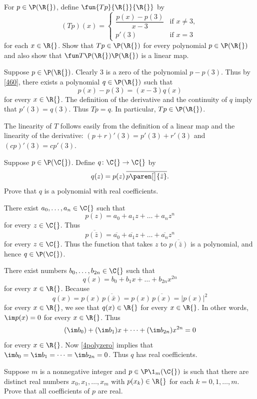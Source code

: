 \exercise
For $p \in \P(\R{})$, define $\fun {Tp} {\R{}} {\R{}}$ by
\[
(Tp)(x) =
\begin{cases}
\dfrac{p(x) - p(3)}{x-3} & \text{if } x \ne 3,\\[9bp]
p' \! (3) & \text{if } x = 3
\end{cases}
\]
for each $x \in \R{}$. Show that $Tp \in \P(\R{})$ for every polynomial $p \in \P(\R{})$ and also show that $\fun T {\P(\R{})} {\P(\R{})}$ is a linear map.

\begin{Solution}
Suppose $p \in \P(\R{})$. Clearly $3$ is a zero of the polynomial $p - p(3)$. Thus by \ref{460}, there exists a polynomial $q \in \P(\R{})$ such that
\[
p(x) - p(3) = (x - 3) q(x)
\]
for every $x \in \R{}$. The definition of the derivative and the continuity of $q$ imply that $p' \! (3) = q(3)$. Thus $Tp = q$. In particular, $Tp \in \P(\R{})$.

The linearity of $T$ follows easily from the definition of a linear map and the linearity of the derivative: $(p + r)' \! (3) = p' \! (3) + r' \! (3)$ and $(cp)' \! (3) = c p' \! (3)$.
\end{Solution}

\exercise
Suppose $p \in \P(\C{})$. Define $q \colon \C{} \to \C{}$ by
\[
q(z) = p(z) \, \overline{ p\paren[\big]{\bar{z}} }.
\]
Prove that $q$ is a polynomial with real coefficients.

\begin{Solution}
There exist $a_0, \dots, a_n \in \C{}$ such that
\[
p(z) = a_0 + a_1 z + \dots + a_n z^n
\]
for every $z \in \C{}$. Thus
\[
\overline{ p(\bar{z}) } = \overline{a_0} + \overline{a_1} z + \dots + \overline{a_n} z^n
\]
for every $z \in \C{}$. Thus the function that takes $z$ to $\overline{ p(\bar{z}) }$ is a polynomial, and hence $q \in \P(\C{})$.

There exist numbers $b_0, \dots, b_{2n} \in \C{}$ such that
\[
q(x) = b_0 + b_1 x + \dots + b_{2n} x^{2n}
\]
for every $x \in \R{}$. Because
\[
q(x) = p(x) \, \overline{ p(\bar{x} ) } = p(x) \, \overline{p(x)} = |p(x)|^2
\]
for every $x \in \R{}$, we see that $q(x) \in \R{}$ for every $x \in \R{}$. In other words, $\im p(x) = 0$ for every $x \in \R{}$. Thus
\[
(\im b_0) + (\im b_1)x + \dots + (\im b_{2n}) x^{2n} = 0
\]
for every $x \in \R{}$. Now \ref{4polyzero} implies that $\im b_0 = \im b_1 = \dots = \im b_{2n} = 0$. Thus $q$ has real coefficients.
\end{Solution}

\exercise
Suppose $m$ is a nonnegative integer and $p \in \P\1_m(\C{})$ is such that there are distinct real numbers $x_0, x_1, \dots, x_m$ with $p(x_k) \in \R{}$ for each $k = 0, 1, \dots, m$. Prove that all coefficients of $p$ are real.

